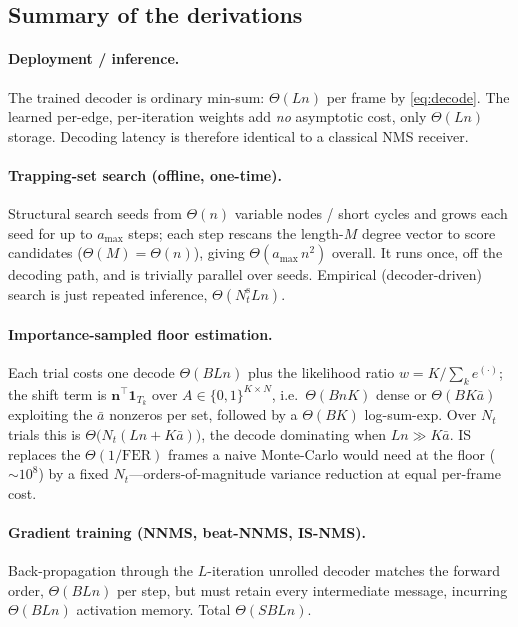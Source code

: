 \subsection{Summary of the derivations}

\paragraph{Deployment / inference.}
The trained decoder is ordinary min-sum: $\Theta(Ln)$ per frame by
\eqref{eq:decode}. The learned per-edge, per-iteration weights add \emph{no}
asymptotic cost, only $\Theta(Ln)$ storage. Decoding latency is therefore
identical to a classical NMS receiver.

\paragraph{Trapping-set search (offline, one-time).}
Structural search seeds from $\Theta(n)$ variable nodes / short cycles and grows
each seed for up to $a_{\max}$ steps; each step rescans the length-$M$ degree
vector to score candidates ($\Theta(M)=\Theta(n)$), giving
$\Theta(a_{\max}\,n^{2})$ overall. It runs once, off the decoding path, and is
trivially parallel over seeds. Empirical (decoder-driven) search is just
repeated inference, $\Theta(N_t^{\mathrm{s}}Ln)$.

\paragraph{Importance-sampled floor estimation.}
Each trial costs one decode $\Theta(BLn)$ plus the likelihood ratio
$w=K/\sum_k e^{(\cdot)}$; the shift term is $\mathbf n^\top\mathbf 1_{T_k}$ over
$A\in\{0,1\}^{K\times N}$, i.e.\ $\Theta(BnK)$ dense or $\Theta(BK\bar a)$
exploiting the $\bar a$ nonzeros per set, followed by a $\Theta(BK)$
log-sum-exp. Over $N_t$ trials this is $\Theta\!\big(N_t(Ln+K\bar a)\big)$, the
decode dominating when $Ln\gg K\bar a$. IS replaces the $\Theta(1/\mathrm{FER})$
frames a naive Monte-Carlo would need at the floor ($\sim\!10^{8}$) by a fixed
$N_t$---orders-of-magnitude variance reduction at equal per-frame cost.

\paragraph{Gradient training (NNMS, beat-NNMS, IS-NMS).}
Back-propagation through the $L$-iteration unrolled decoder matches the forward
order, $\Theta(BLn)$ per step, but must retain every intermediate message,
incurring $\Theta(BLn)$ activation memory. Total $\Theta(SBLn)$.

